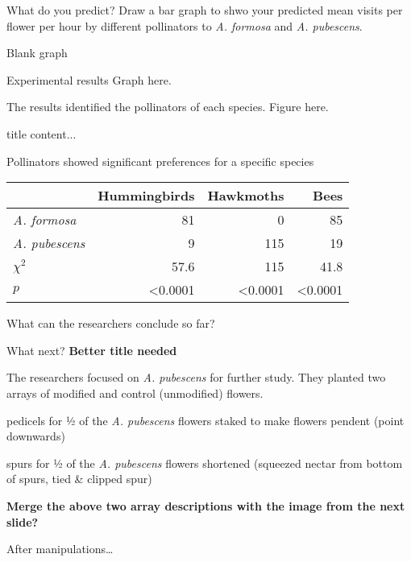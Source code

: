 \documentclass[t,hidelinks]{beamer}
\begin{document}
%
\begin{frame}[t]{What do you predict?}
	\hangpara Draw a bar graph to shwo your predicted mean visits per flower per hour by different pollinators to \textit{A. formosa} and \textit{A. pubescens}.
	
	\hangpara Blank graph
\end{frame}
%
\begin{frame}[t]{Experimental results}
	Graph here.
\end{frame}
%
\begin{frame}[t]{The results identified the pollinators of each species.}
	Figure here.
\end{frame}
%
\begin{frame}[t]{title}
	content...
\end{frame}
%
\begin{frame}[t]{Pollinators showed significant preferences for a specific species}
		
	\begin{center}
	\begin{tabular}{lrrr}
	\toprule
		 	& Hummingbirds & Hawkmoths & Bees \tabularnewline
	\midrule
	\textit{A. formosa}		&	81	&	0	&	85 \tabularnewline
	\textit{A. pubescens}	&	9	&	115	&	19 \tabularnewline
	$\chi^2$				&	57.6	&	115	&	41.8 \tabularnewline
	$p$						&  \textless0.0001 & \textless0.0001 & \textless0.0001 \tabularnewline
	\bottomrule
	\end{tabular}
	\end{center}

	\hangpara What can the researchers conclude so far?
\end{frame}
%
\begin{frame}[t]{What next? \textbf{Better title needed}}
	
	\hangpara The researchers focused on \textit{A. pubescens} for further study. They planted two arrays of modified and control (unmodified) flowers.

	\hangpara {} pedicels for ½ of the \textit{A. pubescens} flowers staked to make flowers pendent (point downwards)
	
	\hangpara {} spurs for ½ of the \textit{A. pubescens} flowers shortened (squeezed nectar from bottom of spurs, tied \& clipped spur)
	
	\textbf{Merge the above two array descriptions with the image from the next slide?}

\end{frame}
%
\begin{frame}[t]{After manipulations\dots}
	
	
\end{frame}
\end{document}

